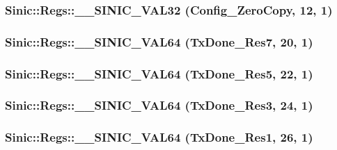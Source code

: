 \label{namespaceSinic_1_1Regs_a76178a015709c6e9dd675896de3e34c9}
\hypertarget{namespaceSinic_1_1Regs_ade19c3f47499bb3575e71cfa918cf31e}{
\subsubsection[{\_\-\_\-SINIC\_\-VAL32}]{\setlength{\rightskip}{0pt plus 5cm}Sinic::Regs::\_\-\_\-SINIC\_\-VAL32 (Config\_\-ZeroCopy, \/  12, \/  1)}}
\label{namespaceSinic_1_1Regs_ade19c3f47499bb3575e71cfa918cf31e}
\hypertarget{namespaceSinic_1_1Regs_a580467be57553482595f25dc434f86c8}{
\subsubsection[{\_\-\_\-SINIC\_\-VAL64}]{\setlength{\rightskip}{0pt plus 5cm}Sinic::Regs::\_\-\_\-SINIC\_\-VAL64 (TxDone\_\-Res7, \/  20, \/  1)}}
\label{namespaceSinic_1_1Regs_a580467be57553482595f25dc434f86c8}
\hypertarget{namespaceSinic_1_1Regs_a5f79ddf6ede0e8be182ff9a7cf66f912}{
\subsubsection[{\_\-\_\-SINIC\_\-VAL64}]{\setlength{\rightskip}{0pt plus 5cm}Sinic::Regs::\_\-\_\-SINIC\_\-VAL64 (TxDone\_\-Res5, \/  22, \/  1)}}
\label{namespaceSinic_1_1Regs_a5f79ddf6ede0e8be182ff9a7cf66f912}
\hypertarget{namespaceSinic_1_1Regs_a4bd7c6ed99d7e28ea474505fc26ef0c7}{
\subsubsection[{\_\-\_\-SINIC\_\-VAL64}]{\setlength{\rightskip}{0pt plus 5cm}Sinic::Regs::\_\-\_\-SINIC\_\-VAL64 (TxDone\_\-Res3, \/  24, \/  1)}}
\label{namespaceSinic_1_1Regs_a4bd7c6ed99d7e28ea474505fc26ef0c7}
\hypertarget{namespaceSinic_1_1Regs_ab8855564b0d8a0f52607d6b83fd6c6ab}{
\subsubsection[{\_\-\_\-SINIC\_\-VAL64}]{\setlength{\rightskip}{0pt plus 5cm}Sinic::Regs::\_\-\_\-SINIC\_\-VAL64 (TxDone\_\-Res1, \/  26, \/  1)}}
